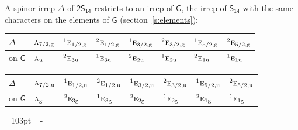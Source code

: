 \documentclass[10pt,a4paper]{article}
\newcommand{\needspace}[1]{\par\penalty-100\begingroup\dimen0=#1\relax\dimen2=\pagegoal
  \advance\dimen2-\pagetotal\ifdim\dimen0>\dimen2\relax\ifdim\dimen2>0pt\vfil\break\fi\fi
  \endgroup}
\numberwithin{equation}{section}
\newcommand{\grp}[1]{\mathsf{#1}}
\newcommand{\irr}[1]{\text{\normalfont\scshape #1}}
\newcommand{\conjpair}[1]{{}^{#1}}
\newcommand{\ptag}[1]{\mathrm{#1}}
\begin{document}
A spinor irrep $\Delta$ of \href{2S14.pdf}{$\grp{2S_{14}}$} restricts to an irrep of $\grp{G}$, the irrep of $\grp{S_{14}}$ with the same characters on the elements of $\grp{G}$ (section~\ref{s:elements}):
\begin{center}\begin{tabular}{@{}llllllll@{}}\toprule
$\Delta$ & $\irr{a}_{7/2,\ptag{g}}$ & $\conjpair{1}\irr{e}_{1/2,\ptag{g}}$ & $\conjpair{2}\irr{e}_{1/2,\ptag{g}}$ & $\conjpair{1}\irr{e}_{3/2,\ptag{g}}$ & $\conjpair{2}\irr{e}_{3/2,\ptag{g}}$ & $\conjpair{1}\irr{e}_{5/2,\ptag{g}}$ & $\conjpair{2}\irr{e}_{5/2,\ptag{g}}$\\\midrule
on $\grp{G}$ & $\irr{a}_{\ptag{u}}$ & $\conjpair{2}\irr{e}_{3\ptag{u}}$ & $\conjpair{1}\irr{e}_{3\ptag{u}}$ & $\conjpair{2}\irr{e}_{2\ptag{u}}$ & $\conjpair{1}\irr{e}_{2\ptag{u}}$ & $\conjpair{2}\irr{e}_{1\ptag{u}}$ & $\conjpair{1}\irr{e}_{1\ptag{u}}$\\
\bottomrule\end{tabular}\end{center}
\begin{center}\begin{tabular}{@{}llllllll@{}}\toprule
$\Delta$ & $\irr{a}_{7/2,\ptag{u}}$ & $\conjpair{1}\irr{e}_{1/2,\ptag{u}}$ & $\conjpair{2}\irr{e}_{1/2,\ptag{u}}$ & $\conjpair{1}\irr{e}_{3/2,\ptag{u}}$ & $\conjpair{2}\irr{e}_{3/2,\ptag{u}}$ & $\conjpair{1}\irr{e}_{5/2,\ptag{u}}$ & $\conjpair{2}\irr{e}_{5/2,\ptag{u}}$\\\midrule
on $\grp{G}$ & $\irr{a}_{\ptag{g}}$ & $\conjpair{2}\irr{e}_{3\ptag{g}}$ & $\conjpair{1}\irr{e}_{3\ptag{g}}$ & $\conjpair{2}\irr{e}_{2\ptag{g}}$ & $\conjpair{1}\irr{e}_{2\ptag{g}}$ & $\conjpair{2}\irr{e}_{1\ptag{g}}$ & $\conjpair{1}\irr{e}_{1\ptag{g}}$\\
\bottomrule\end{tabular}\end{center}
\needspace{103pt}
\end{document}
